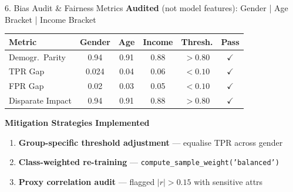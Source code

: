 \documentclass[aspectratio=169, 10pt]{beamer}
\newcommand{\cmark}{\checkmark}
\begin{document}
\begin{frame}{6. Bias Audit \& Fairness Metrics}
\small
\textbf{Audited} (not model features): Gender | Age Bracket | Income Bracket\\[4pt]

\footnotesize
\begin{center}
\begin{tabular}{@{}l c c c c c@{}}
  \toprule
  \textbf{Metric} & \textbf{Gender} & \textbf{Age} & \textbf{Income} & \textbf{Thresh.} & \textbf{Pass} \\
  \midrule
  Demogr.\ Parity   & 0.94  & 0.91 & 0.88 & $>0.80$ & \textcolor{green500}{$\cmark$} \\
  TPR Gap            & 0.024 & 0.04 & 0.06 & $<0.10$ & \textcolor{green500}{$\cmark$} \\
  FPR Gap            & 0.02  & 0.03 & 0.05 & $<0.10$ & \textcolor{green500}{$\cmark$} \\
  Disparate Impact   & 0.94  & 0.91 & 0.88 & $>0.80$ & \textcolor{green500}{$\cmark$} \\
  \bottomrule
\end{tabular}
\end{center}

\vspace{4pt}
\small
\textbf{\color{teal}Mitigation Strategies Implemented}
\begin{enumerate}\setlength\itemsep{1pt}\footnotesize
  \item \textbf{Group-specific threshold adjustment} --- equalise TPR across gender
  \item \textbf{Class-weighted re-training} --- \texttt{compute\_sample\_weight('balanced')}
  \item \textbf{Proxy correlation audit} --- flagged $|r| > 0.15$ with sensitive attrs
\end{enumerate}
\end{frame}
\end{document}
